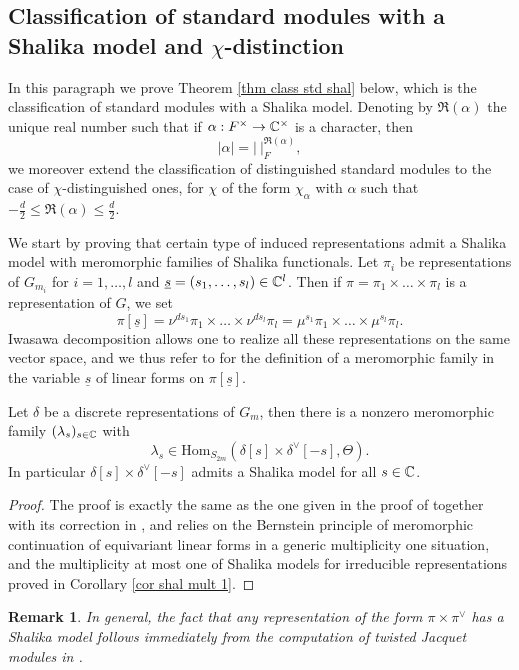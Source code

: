 \documentclass[11pt,letterpaper]{amsart}
\newcommand{\re}{\mathfrak{R}}
\newcommand{\Hom}{\mathrm{Hom}}
\def\d{\delta}
\theoremstyle{plain}
\newtheorem {rem}[thm]{Remark} \newtheorem{ex}[thm]{Example}
\numberwithin{equation}{section}
\begin{document}
\subsection{Classification of standard modules with a Shalika model and $\chi$-distinction}

In this paragraph we prove Theorem \ref{thm class std shal} below, which is the classification of standard modules with a Shalika model. Denoting by $\re(\alpha)$ the unique real number such that if $\alpha:F^\times \to {\mathbb {C}}^{\times}$ is a character, then 
\[|\alpha|=|\ |_F^{\re(\alpha)},\] we moreover extend the classification of distinguished standard modules to the case of $\chi$-distinguished ones, for $\chi$ of the form $\chi_{\alpha}$ with $\alpha$ such that $-\frac{d}{2}\leq \re(\alpha)\leq \frac{d}{2}$. 

We start by proving that certain type of induced representations admit a Shalika model with meromorphic families of Shalika functionals. Let 
$\pi_i$ be representations of $G_{m_i}$ for $i=1,\dots,l$ and $\underline{s}=(s_1,\dots,s_l) \in {\mathbb {C}}^l$. Then if $\pi=\pi_1 \times \dots \times \pi_l$ is a representation of $G$, we set 
\[\pi[\underline{s}]=\nu^{ds_1}\pi_1 \times \dots \times \nu^{ds_l}\pi_l=\mu^{s_1}\pi_1 \times \dots \times \mu^{s_l}\pi_l.\] Iwasawa decomposition allows one to realize all these representations on the same vector space, and we thus refer to \cite[2.5]{MO} for the definition of a meromorphic family in the variable $\underline{s}$ of linear forms on $\pi[\underline{s}]$. 

\begin{prop}\label{prop mero shal 1}
Let $\d$ be a discrete representations of $G_m$, then there is a nonzero meromorphic family $(\lambda_s)_{s\in {\mathbb {C}}}$ with \[\lambda_s\in \Hom_{S_{2m}}(\d[s]\times \d^\vee[-s],\Theta).\] In particular $\d[s]\times \d^\vee[-s]$ admits a Shalika model for all $s\in {\mathbb {C}}$.
\end{prop}
\begin{proof}
The proof is exactly the same as the one given in the proof of \cite[Lemma 3.11]{MatCRELLE} together with its correction 
in \cite[Proposition 5.3]{MatBF2}, and relies on the Bernstein principle of meromorphic continuation of equivariant linear forms in a generic 
multiplicity one situation, and the multiplicity at most one of Shalika models for irreducible representations proved in Corollary \ref{cor shal mult 1}.
\end{proof}
\begin{rem}
In general, the fact that any representation of the form $\pi\times \pi^\vee$ has a Shalika model follows immediately from the computation of 
twisted Jacquet modules in \cite[Theorem 2.1]{PR}.
\end{rem}
\end{document}
